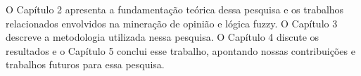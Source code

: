 \documentclass[template.tex]{subfiles}
\begin{document}

O Capítulo 2 apresenta a fundamentação teórica dessa pesquisa e os trabalhos relacionados envolvidos na mineração de opinião e lógica fuzzy. O Capítulo 3 descreve a metodologia utilizada nessa pesquisa. O Capítulo 4 discute os resultados e o Capítulo 5 conclui esse trabalho, apontando nossas contribuições e trabalhos futuros para essa pesquisa.


\end{document}
